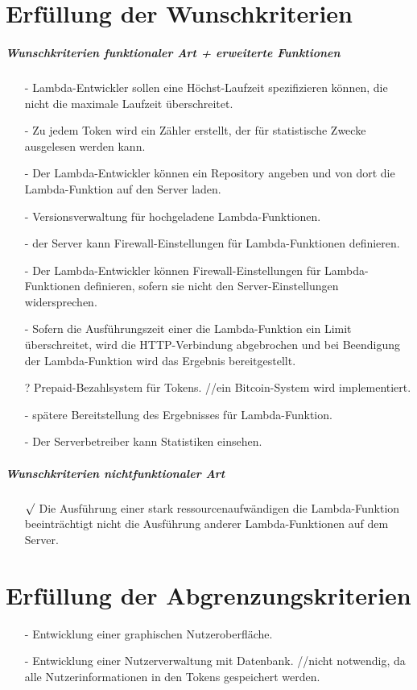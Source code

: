 \documentclass[a4paper,20pt,oneside]{book}
\begin{document}
	\section{Erfüllung der Wunschkriterien}
	\subparagraph{Wunschkriterien funktionaler Art + erweiterte Funktionen}
	\begin{itemize}
		\item[-] Lambda-Entwickler sollen eine Höchst-Laufzeit spezifizieren können, die nicht die maximale Laufzeit überschreitet.
		\item[-] Zu jedem Token wird ein Zähler erstellt, der für statistische Zwecke ausgelesen werden kann.
		\item[-] Der Lambda-Entwickler können ein Repository angeben und von dort die Lambda-Funktion auf den Server laden.
		\item[-] Versionsverwaltung für hochgeladene Lambda-Funktionen.
		\item[-] der Server kann Firewall-Einstellungen für Lambda-Funktionen definieren.
		\item[-] Der Lambda-Entwickler können Firewall-Einstellungen für Lambda-Funktionen definieren, sofern sie nicht den Server-Einstellungen widersprechen.
		\item[-] Sofern die Ausführungszeit einer die Lambda-Funktion ein Limit überschreitet, wird die HTTP-Verbindung abgebrochen und bei Beendigung der Lambda-Funktion wird das Ergebnis bereitgestellt.
		\item[?] Prepaid-Bezahlsystem für Tokens. //ein Bitcoin-System wird implementiert.
		\item[-] spätere Bereitstellung des Ergebnisses für Lambda-Funktion.
		\item[-] Der Serverbetreiber kann Statistiken einsehen.
	\end{itemize}
	
	\subparagraph{Wunschkriterien nichtfunktionaler Art}
	\begin{itemize}
		\item[$\surd$] Die Ausführung einer stark ressourcenaufwändigen die Lambda-Funktion beeinträchtigt nicht die Ausführung anderer Lambda-Funktionen auf dem Server.
	\end{itemize}
	
	\section{Erfüllung der Abgrenzungskriterien}
	\begin{itemize}
		\item[-] Entwicklung einer graphischen Nutzeroberfläche.
		\item[-] Entwicklung einer Nutzerverwaltung mit Datenbank. //nicht notwendig, da alle Nutzerinformationen in den Tokens gespeichert werden.
	\end{itemize}
	\printglossaries
\end{document}
